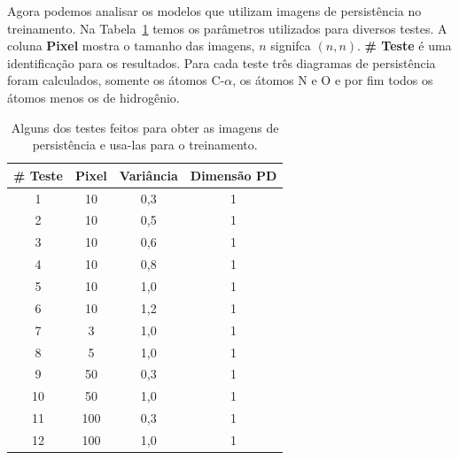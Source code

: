 Agora podemos analisar os modelos que utilizam imagens de persistência no treinamento. Na 
Tabela~\ref{tab:run_numb} temos
os parâmetros utilizados para diversos testes. A coluna \textbf{Pixel} mostra o tamanho das imagens, $n$
signifca $(n,n)$. \textbf{\# Teste} é uma identificação para os resultados. Para cada teste três diagramas
de persistência foram calculados, somente os átomos C-$\alpha$, os átomos N e O e por fim todos os átomos
menos os de hidrogênio.

\begin{table}[!htbp]
    \centering
    \caption{Alguns dos testes feitos para obter as imagens de persistência e usa-las para o
             treinamento.}
    \label{tab:run_numb}
    \begin{tabular}{@{}cccc@{}}
    \toprule
    \textbf{\# Teste} & \textbf{Pixel} & \textbf{Variância} & \textbf{Dimensão PD} \\
    \midrule
    1                   & 10                  & 0,3             & 1                     \\
    2                   & 10                  & 0,5             & 1                     \\
    3                   & 10                  & 0,6             & 1                     \\
    4                   & 10                  & 0,8             & 1                     \\
    5                   & 10                  & 1,0             & 1                     \\
    6                   & 10                  & 1,2             & 1                     \\
    7                   & 3                   & 1,0             & 1                     \\
    8                   & 5                   & 1,0             & 1                     \\
    9                   & 50                  & 0,3             & 1                     \\
    10                  & 50                  & 1,0             & 1                     \\
    11                  & 100                 & 0,3             & 1                     \\
    12                  & 100                 & 1,0             & 1                     \\

\end{tabular}
\end{table}
